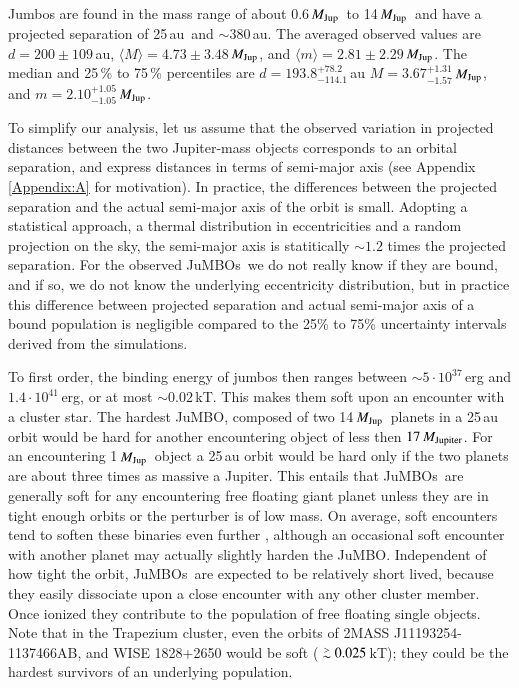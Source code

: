 \documentclass[submission,phys]{lib/SciPost}
\newcommand{\MJup}{\mbox{${M}_{\rm Jup}$}}
\def\apgt{\ {\raise-.5ex\hbox{$\buildrel>\over\sim$}}\ }
\newcommand{\jumbo}{\mbox{JuMBO}}
\newcommand{\jumbos}{\mbox{JuMBOs}}
\begin{document}
Jumbos are found in the mass range of about 0.6\,\MJup\, to
14\,\MJup\, and have a projected separation of 25\,au\, and $\sim
380$\,au.  The averaged observed values are $d=200\pm109$\,au,
$\langle M\rangle = 4.73\pm3.48$\,\MJup, and $\langle m\rangle =
2.81\pm2.29$\,\MJup. The median and 25\,\% to 75\,\% percentiles are
$d = 193.8^{+78.2}_{-114.1}$\,au $M = 3.67^{+1.31}_{-1.57}$\,\MJup,
and $m = 2.10^{+1.05}_{-1.05}$\,\MJup.

To simplify our analysis, let us assume that the observed variation in
projected distances between the two Jupiter-mass objects corresponds
to an orbital separation, and express distances in terms of semi-major
axis (see Appendix\,\ref{Appendix:A} for motivation).  In practice,
the differences between the projected separation and the actual
semi-major axis of the orbit is small. Adopting a statistical
approach, a thermal distribution in eccentricities and a random
projection on the sky, the semi-major axis is statitically $\sim 1.2$
times the projected separation.  For the observed \jumbos\, we do not
really know if they are bound, and if so, we do not know the
underlying eccentricity distribution, but in practice this difference
between projected separation and actual semi-major axis of a bound
population is negligible compared to the 25\% to 75\% uncertainty
intervals derived from the simulations.

To first order, the binding energy of jumbos then ranges between $\sim
5\cdot 10^{37}$\,erg and $1.4\cdot 10^{41}$\,erg, or at most $\sim
0.02$\,kT. This makes them soft upon an encounter with a cluster star.
The hardest \jumbo, composed of two 14\,\MJup\, planets in a 25\,au
orbit would be hard for another encountering object of less then
$17\,M_{\rm Jupiter}$.  For an encountering 1\,\MJup\, object a 25\,au
orbit would be hard only if the two planets are about three times as
massive a Jupiter.  This entails that \jumbos\, are generally soft for
any encountering free floating giant planet unless they are in tight
enough orbits or the perturber is of low mass.  On average, soft
encounters tend to soften these binaries even further
\cite{1975MNRAS.173..729H}, although an occasional soft encounter with
another planet may actually slightly harden the \jumbo.  Independent
of how tight the orbit, \jumbos\, are expected to be relatively short
lived, because they easily dissociate upon a close encounter with any
other cluster member.  Once ionized they contribute to the population
of free floating single objects.  Note that in the Trapezium cluster,
even the orbits of 2MASS J11193254-1137466AB, and WISE 1828+2650 would
be soft ($\apgt 0.025$\,kT); they could be the hardest
survivors of an underlying population.
\end{document}
